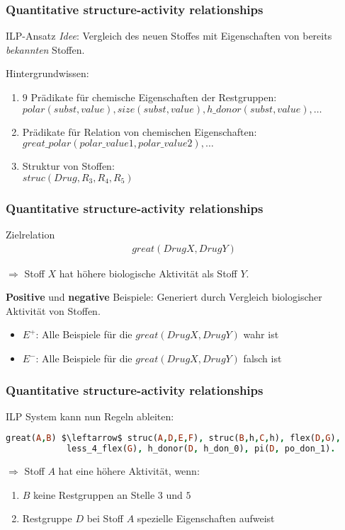 \begin{frame}
	\frametitle{Quantitative structure-activity relationships}
	\begin{block}{ILP-Ansatz}
		\emph{Idee}: Vergleich des neuen Stoffes mit Eigenschaften von bereits \emph{bekannten}
		Stoffen.\\
	\end{block}
		Hintergrundwissen:
		\begin{enumerate}
			\item { $9$ Prädikate für chemische Eigenschaften der Restgruppen:\\
				$polar(subst, value), size(subst, value),
				h\_donor(subst, value), \ldots$}
			\item { Prädikate für Relation von chemischen Eigenschaften:\\
				$great\_polar(polar\_value1, polar\_value2), \ldots$}
			\item {Struktur von Stoffen:\\
				$struc(Drug, R_3, R_4, R_5)$ }
		\end{enumerate}
\end{frame}

\begin{frame}
	\frametitle{Quantitative structure-activity relationships}
	\begin{block}{Zielrelation}
		\begin{align*}
			great(DrugX, DrugY)
		\end{align*}
	\end{block}
	$\Rightarrow$ Stoff $X$ hat höhere biologische Aktivität als Stoff $Y$.

	\vspace{1cm}

	\textbf{Positive} und \textbf{negative} Beispiele:
	Generiert durch Vergleich biologischer Aktivität von Stoffen. 
	\begin{itemize}
		\item $E^+$: Alle Beispiele für die $great(DrugX, DrugY)$ wahr ist
		\item $E^-$: Alle Beispiele für die $great(DrugX, DrugY)$ falsch ist
	\end{itemize}
\end{frame}

\begin{frame}[fragile]
	\frametitle{Quantitative structure-activity relationships}
	ILP System kann nun Regeln ableiten:
	\begin{bsp}
		\begin{lstlisting}[language=prolog]
			great(A,B) $\leftarrow$ struc(A,D,E,F), struc(B,h,C,h), flex(D,G),
			less_4_flex(G), h_donor(D, h_don_0), pi(D, po_don_1).
		\end{lstlisting}
	\end{bsp}
	$\Rightarrow$ Stoff $A$ hat eine höhere Aktivität, wenn:
	\begin{enumerate}
		\item $B$ keine Restgruppen an Stelle $3$ und $5$
		\item Restgruppe $D$ bei Stoff $A$ spezielle Eigenschaften aufweist
	\end{enumerate}
\end{frame}

